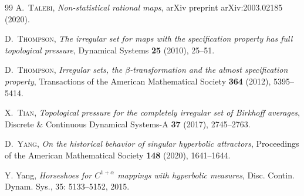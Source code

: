 \documentclass{amsart}
\theoremstyle{plain}
\theoremstyle{definition}
\theoremstyle{remark}
\numberwithin{equation}{section}
\begin{document}
\begin{thebibliography}{99}
      \textsc{A.~Talebi},
      \textit{Non-statistical rational maps},
arXiv preprint arXiv:2003.02185
  (2020).

\textsc{D.~Thompson},
\textit{The irregular set for maps with the specification property has full topological pressure},
Dynamical Systems
\textbf{25} (2010), 
25--51.

\textsc{D.~Thompson},
\textit{Irregular sets, the $\beta$-transformation and the almost specification property},
Transactions of the American Mathematical Society
\textbf{364} (2012), 
5395--5414.

\textsc{X.~Tian},
\textit{Topological pressure for the completely irregular set of Birkhoff averages},
Discrete \& Continuous Dynamical Systems-A
\textbf{37} (2017), 
2745--2763.





\textsc{D.~Yang},
\textit{On the historical behavior of singular hyperbolic attractors},
Proceedings of the American Mathematical Society
\textbf{148} (2020), 
1641--1644.

Y. Yang, \emph{Horseshoes for $C^{1+\alpha}$ mappings with hyperbolic measures}, Disc. Contin. Dynam.
Sys., 35: 5133–5152, 2015.


%
%


\end{thebibliography}
\end{document}
